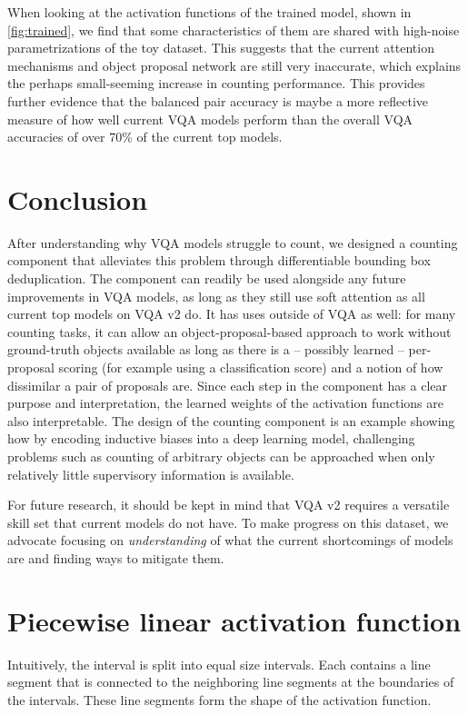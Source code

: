 \documentclass[letterpaper]{article}
\begin{document}
When looking at the activation functions of the trained model, shown in \autoref{fig:trained}, we find that some characteristics of them are shared with high-noise parametrizations of the toy dataset.
This suggests that the current attention mechanisms and object proposal network are still very inaccurate, which explains the perhaps small-seeming increase in counting performance.
This provides further evidence that the balanced pair accuracy is maybe a more reflective measure of how well current VQA models perform than the overall VQA accuracies of over 70\% of the current top models.

\section{Conclusion}\label{sec:conclusion}
After understanding why VQA models struggle to count, we designed a counting component that alleviates this problem through differentiable bounding box deduplication.
The component can readily be used alongside any future improvements in VQA models, as long as they still use soft attention as all current top models on VQA v2 do.
It has uses outside of VQA as well: for many counting tasks, it can allow an object-proposal-based approach to work without ground-truth objects available as long as there is a -- possibly learned -- per-proposal scoring (for example using a classification score) and a notion of how dissimilar a pair of proposals are.
Since each step in the component has a clear purpose and interpretation, the learned weights of the activation functions are also interpretable.
The design of the counting component is an example showing how by encoding inductive biases into a deep learning model, challenging problems such as counting of arbitrary objects can be approached when only relatively little supervisory information is available.

For future research, it should be kept in mind that VQA v2 requires a versatile skill set that current models do not have.
To make progress on this dataset, we advocate focusing on \emph{understanding} of what the current shortcomings of models are and finding ways to mitigate them.





\newpage
\appendix


\section{Piecewise linear activation function}\label{app:plin}
Intuitively, the interval  is split into  equal size intervals.
Each contains a line segment that is connected to the neighboring line segments at the boundaries of the intervals.
These line segments form the shape of the activation function.
\end{document}
